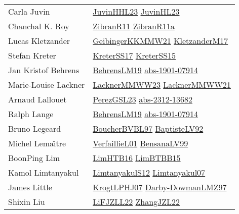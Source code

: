 {\begin{longtable}{p{4cm}p{20cm}}
Carla Juvin & \href{papers/JuvinHHL23.pdf}{JuvinHHL23}\cite{JuvinHHL23} \href{papers/JuvinHL23.pdf}{JuvinHL23}\cite{JuvinHL23} \\
Chanchal K. Roy & \href{papers/ZibranR11.pdf}{ZibranR11}\cite{ZibranR11} \href{papers/ZibranR11a.pdf}{ZibranR11a}\cite{ZibranR11a} \\
Lucas Kletzander & \href{papers/GeibingerKKMMW21.pdf}{GeibingerKKMMW21}\cite{GeibingerKKMMW21} \href{papers/KletzanderM17.pdf}{KletzanderM17}\cite{KletzanderM17} \\
Stefan Kreter & \href{articles/KreterSS17.pdf}{KreterSS17}\cite{KreterSS17} \href{papers/KreterSS15.pdf}{KreterSS15}\cite{KreterSS15} \\
Jan Kristof Behrens & \href{papers/BehrensLM19.pdf}{BehrensLM19}\cite{BehrensLM19} \href{articles/abs-1901-07914.pdf}{abs-1901-07914}\cite{abs-1901-07914} \\
Marie{-}Louise Lackner & \href{articles/LacknerMMWW23.pdf}{LacknerMMWW23}\cite{LacknerMMWW23} \href{papers/LacknerMMWW21.pdf}{LacknerMMWW21}\cite{LacknerMMWW21} \\
Arnaud Lallouet & \href{papers/PerezGSL23.pdf}{PerezGSL23}\cite{PerezGSL23} \href{articles/abs-2312-13682.pdf}{abs-2312-13682}\cite{abs-2312-13682} \\
Ralph Lange & \href{papers/BehrensLM19.pdf}{BehrensLM19}\cite{BehrensLM19} \href{articles/abs-1901-07914.pdf}{abs-1901-07914}\cite{abs-1901-07914} \\
Bruno Legeard & \href{papers/BoucherBVBL97.pdf}{BoucherBVBL97}\cite{BoucherBVBL97} \href{papers/BaptisteLV92.pdf}{BaptisteLV92}\cite{BaptisteLV92} \\
Michel Lema{\^{\i}}tre & \href{papers/VerfaillieL01.pdf}{VerfaillieL01}\cite{VerfaillieL01} \href{articles/BensanaLV99.pdf}{BensanaLV99}\cite{BensanaLV99} \\
BoonPing Lim & \href{papers/LimHTB16.pdf}{LimHTB16}\cite{LimHTB16} \href{papers/LimBTBB15.pdf}{LimBTBB15}\cite{LimBTBB15} \\
Kamol Limtanyakul & \href{articles/LimtanyakulS12.pdf}{LimtanyakulS12}\cite{LimtanyakulS12} \href{papers/Limtanyakul07.pdf}{Limtanyakul07}\cite{Limtanyakul07} \\
James Little & \href{papers/KrogtLPHJ07.pdf}{KrogtLPHJ07}\cite{KrogtLPHJ07} \href{articles/Darby-DowmanLMZ97.pdf}{Darby-DowmanLMZ97}\cite{Darby-DowmanLMZ97} \\
Shixin Liu & \href{papers/LiFJZLL22.pdf}{LiFJZLL22}\cite{LiFJZLL22} \href{papers/ZhangJZL22.pdf}{ZhangJZL22}\cite{ZhangJZL22} \\

\end{longtable}}
